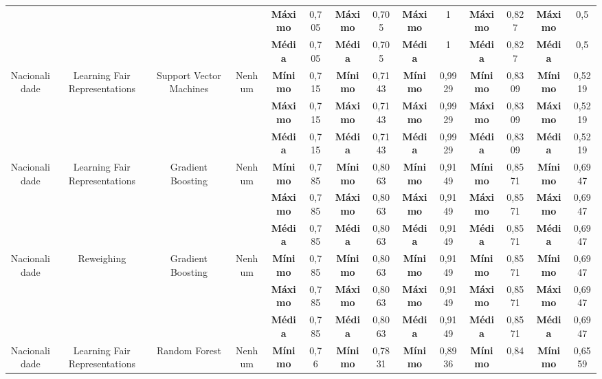 \documentclass[Portugues,Final]{ic-tese-v3}
\begin{document}
\begin{table}[H]
\begin{center}
{\begin{tabular}{c|c|c|c|c|c|c|c|c|c|c|c|c|c}
             & & & & \textbf{Máximo} & 0,705 & \textbf{Máximo} & 0,705 & \textbf{Máximo} & 1 & \textbf{Máximo} & 0,827 & \textbf{Máximo} & 0,5 \\
             & & & & \textbf{Média} & 0,705 & \textbf{Média} & 0,705 & \textbf{Média} & 1 & \textbf{Média} & 0,827 & \textbf{Média} & 0,5 \\
            \hline
            \multirow{3}{*}{Nacionalidade} & \multirow{3}{*}{Learning Fair Representations} & \multirow{3}{*}{Support Vector Machines} & \multirow{3}{*}{Nenhum} & \textbf{Mínimo} & 0,715 & \textbf{Mínimo} & 0,7143 & \textbf{Mínimo} & 0,9929 & \textbf{Mínimo} & 0,8309 & \textbf{Mínimo} & 0,5219 \\
             & & & & \textbf{Máximo} & 0,715 & \textbf{Máximo} & 0,7143 & \textbf{Máximo} & 0,9929 & \textbf{Máximo} & 0,8309 & \textbf{Máximo} & 0,5219 \\
             & & & & \textbf{Média} & 0,715 & \textbf{Média} & 0,7143 & \textbf{Média} & 0,9929 & \textbf{Média} & 0,8309 & \textbf{Média} & 0,5219 \\
            \hline
            \multirow{3}{*}{Nacionalidade} & \multirow{3}{*}{Learning Fair Representations} & \multirow{3}{*}{Gradient Boosting} & \multirow{3}{*}{Nenhum} & \textbf{Mínimo} & 0,785 & \textbf{Mínimo} & 0,8063 & \textbf{Mínimo} & 0,9149 & \textbf{Mínimo} & 0,8571 & \textbf{Mínimo} & 0,6947 \\
             & & & & \textbf{Máximo} & 0,785 & \textbf{Máximo} & 0,8063 & \textbf{Máximo} & 0,9149 & \textbf{Máximo} & 0,8571 & \textbf{Máximo} & 0,6947 \\
             & & & & \textbf{Média} & 0,785 & \textbf{Média} & 0,8063 & \textbf{Média} & 0,9149 & \textbf{Média} & 0,8571 & \textbf{Média} & 0,6947 \\
            \hline
            \multirow{3}{*}{Nacionalidade} & \multirow{3}{*}{Reweighing} & \multirow{3}{*}{Gradient Boosting} & \multirow{3}{*}{Nenhum} & \textbf{Mínimo} & 0,785 & \textbf{Mínimo} & 0,8063 & \textbf{Mínimo} & 0,9149 & \textbf{Mínimo} & 0,8571 & \textbf{Mínimo} & 0,6947 \\
             & & & & \textbf{Máximo} & 0,785 & \textbf{Máximo} & 0,8063 & \textbf{Máximo} & 0,9149 & \textbf{Máximo} & 0,8571 & \textbf{Máximo} & 0,6947 \\
             & & & & \textbf{Média} & 0,785 & \textbf{Média} & 0,8063 & \textbf{Média} & 0,9149 & \textbf{Média} & 0,8571 & \textbf{Média} & 0,6947 \\
            \hline
            \multirow{3}{*}{Nacionalidade} & \multirow{3}{*}{Learning Fair Representations} & \multirow{3}{*}{Random Forest} & \multirow{3}{*}{Nenhum} & \textbf{Mínimo} & 0,76 & \textbf{Mínimo} & 0,7831 & \textbf{Mínimo} & 0,8936 & \textbf{Mínimo} & 0,84 & \textbf{Mínimo} & 0,6559 \\

\end{tabular}}
\end{center}
\end{table}
\end{document}
